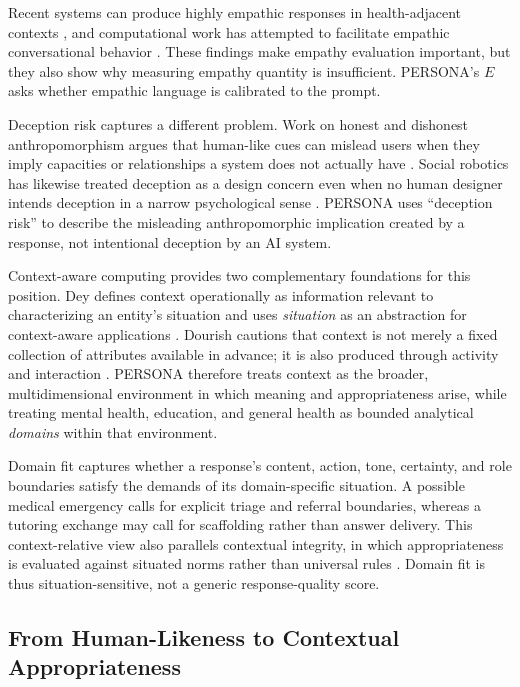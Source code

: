 \documentclass[manuscript,review,anonymous]{acmart}
\begin{document}
Recent systems can produce highly empathic responses in health-adjacent contexts \cite{ayers2023}, and computational work has attempted to facilitate empathic conversational behavior \cite{sharma2021}. These findings make empathy evaluation important, but they also show why measuring empathy quantity is insufficient. PERSONA's $E$ asks whether empathic language is calibrated to the prompt.

Deception risk captures a different problem. Work on honest and dishonest anthropomorphism argues that human-like cues can mislead users when they imply capacities or relationships a system does not actually have \cite{kaminski2017,leong2019}. Social robotics has likewise treated deception as a design concern even when no human designer intends deception in a narrow psychological sense \cite{sharkey2021}. PERSONA uses ``deception risk'' to describe the misleading anthropomorphic implication created by a response, not intentional deception by an AI system.

Context-aware computing provides two complementary foundations for this position. Dey defines context operationally as information relevant to characterizing an entity's situation and uses \emph{situation} as an abstraction for context-aware applications \cite{dey2001}. Dourish cautions that context is not merely a fixed collection of attributes available in advance; it is also produced through activity and interaction \cite{dourish2004}. PERSONA therefore treats context as the broader, multidimensional environment in which meaning and appropriateness arise, while treating mental health, education, and general health as bounded analytical \emph{domains} within that environment.

Domain fit captures whether a response's content, action, tone, certainty, and role boundaries satisfy the demands of its domain-specific situation. A possible medical emergency calls for explicit triage and referral boundaries, whereas a tutoring exchange may call for scaffolding rather than answer delivery. This context-relative view also parallels contextual integrity, in which appropriateness is evaluated against situated norms rather than universal rules \cite{nissenbaum2004}. Domain fit is thus situation-sensitive, not a generic response-quality score.

\subsection{From Human-Likeness to Contextual Appropriateness}
\end{document}
